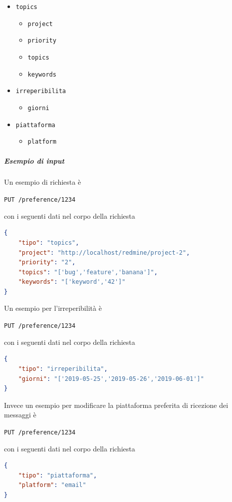 \begin{itemize}[noitemsep]
    \item \texttt{topics}
    \begin{itemize}
        \item \texttt{project}
        \item \texttt{priority}
        \item \texttt{topics}
        \item \texttt{keywords}
    \end{itemize}
    \item \texttt{irreperibilita}
    \begin{itemize}
        \item \texttt{giorni}
    \end{itemize}
    \item \texttt{piattaforma}
    \begin{itemize}
        \item \texttt{platform}
    \end{itemize}
\end{itemize}

    \subparagraph{Esempio di input}
    Un esempio di richiesta è
    \begin{center}
	    \texttt{PUT /preference/1234}
    \end{center}
    con i seguenti dati nel corpo della richiesta
	\begin{lstlisting}[language = json]
{
    "tipo": "topics",
    "project": "http://localhost/redmine/project-2",
    "priority": "2",
    "topics": "['bug','feature','banana']",
    "keywords": "['keyword','42']"
}
    \end{lstlisting}

    Un esempio per l'irreperibilità è
    \begin{center}
	    \texttt{PUT /preference/1234}
    \end{center}
    con i seguenti dati nel corpo della richiesta
	\begin{lstlisting}[language = json]
{
    "tipo": "irreperibilita",
    "giorni": "['2019-05-25','2019-05-26','2019-06-01']"
}
    \end{lstlisting}

    Invece un esempio per modificare la piattaforma preferita di ricezione dei messaggi è
    \begin{center}
	    \texttt{PUT /preference/1234}
    \end{center}
    con i seguenti dati nel corpo della richiesta
	\begin{lstlisting}[language = json]
{
    "tipo": "piattaforma",
    "platform": "email"
}
    \end{lstlisting}

